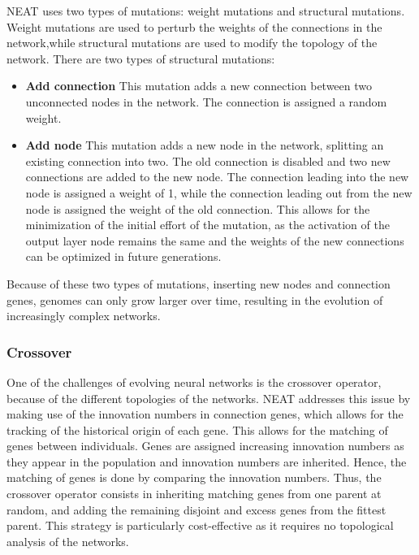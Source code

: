 NEAT uses two types of mutations: weight mutations and structural mutations. Weight mutations are used to perturb the weights of the connections in the network,while
structural mutations are used to modify the topology of the network. There are two types of structural mutations:

\begin{itemize}
    \item \textbf{Add connection} This mutation adds a new connection between two unconnected nodes in the network. The connection is assigned a random weight.
    \item \textbf{Add node} This mutation adds a new node in the network, splitting an existing connection into two. The old connection is disabled and two new
        connections are added to the new node. The connection leading into the new node is assigned a weight of 1, while the connection leading out from the new node is
        assigned the weight of the old connection. This allows for the minimization of the initial effort of the mutation, as the activation of the output layer
        node remains the same and the weights of the new connections can be optimized in future generations.
\end{itemize}

Because of these two types of mutations, inserting new nodes and connection genes, genomes can only grow larger over time, resulting in the evolution of increasingly
complex networks.

\subsubsection{Crossover}

One of the challenges of evolving neural networks is the crossover operator, because of the different topologies of the networks. NEAT addresses this issue by making
use of the innovation numbers in connection genes, which allows for the tracking of the historical origin of each gene. This allows for the matching of genes between
individuals. Genes are assigned increasing innovation numbers as they appear in the population and innovation numbers are inherited. Hence, the matching of genes is done
by comparing the innovation numbers. Thus, the crossover operator consists in inheriting matching genes from one parent at random, and adding the remaining disjoint
and excess genes from the fittest parent. This strategy is particularly cost-effective as it requires no topological analysis of the networks.

